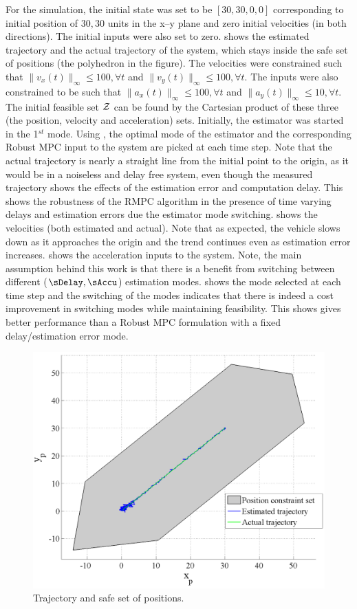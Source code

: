 For the simulation, the initial state was set to be $\left[30,30,0,0\right]$ corresponding to initial position of $30,30$ units in the x--y plane and zero initial velocities (in both directions). The initial inputs were also set to zero.  shows the estimated trajectory and the actual trajectory of the system, which stays inside the safe set of positions (the polyhedron in the figure). The velocities were constrained such that $\|v_{x}(t)\|_\infty \leq 100, \forall t$ and $\|v_{y}(t)\|_\infty \leq 100, \forall t$. The inputs were also constrained to be such that $\|a_x(t)\|_\infty \leq 100, \forall t$ and $\|a_y(t)\|_\infty \leq 10, \forall t$. The initial feasible set $\mathcal{Z}$ can be found by the Cartesian product of these three (the position, velocity and acceleration) sets. Initially, the estimator was started in the 1$^{st}$ mode. Using , the optimal mode of the estimator and the corresponding Robust MPC input to the system are picked at each time step. Note that the actual trajectory is nearly a straight line from the initial point to the origin, as it would be in a noiseless and delay free system, even though the measured trajectory shows the effects of the estimation error and computation delay. This shows the robustness of the RMPC algorithm in the presence of time varying delays and estimation errors due the estimator mode switching.  shows the velocities (both estimated and actual). Note that as expected, the vehicle slows down as it approaches the origin and the trend continues even as estimation error increases.  shows the acceleration inputs to the system. Note, the main assumption behind this work is that there is a benefit from switching between different ($\sDelay, \sAccu$) estimation modes.  shows the mode selected at each time step and the switching of the modes indicates that there is indeed a cost improvement in switching modes while maintaining feasibility. This shows  gives better performance than a Robust MPC formulation with a fixed delay/estimation error mode.

\begin{figure}
  \centering
  \includegraphics[width=0.8\columnwidth]{figs/TrackingTrajectory_scissored.pdf}
  \caption{Trajectory and safe set of positions.}
  \label{fig:TrackingTrajectory_scissored}
\end{figure}

